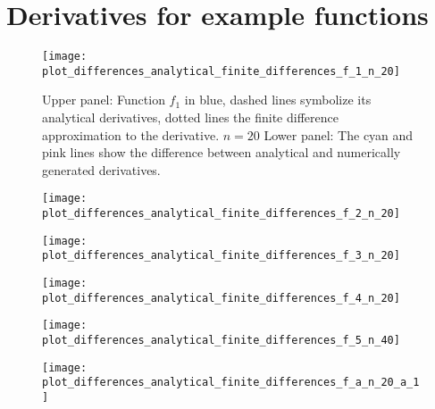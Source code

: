 \section{Derivatives for example functions}

\begin{figure}[h]
		\texttt{[image: plot\_differences\_analytical\_finite\_differences\_f\_1\_n\_20]}
		\caption{Upper panel: Function $f_1$ in blue, dashed lines symbolize its analytical derivatives, dotted lines the finite difference approximation to the derivative. $n= 20$  Lower panel: The cyan and pink lines show the difference between analytical and numerically generated derivatives.}
\end{figure}

\begin{figure}
		\texttt{[image: plot\_differences\_analytical\_finite\_differences\_f\_2\_n\_20]}
		\caption{}
\end{figure}

\begin{figure}
		\texttt{[image: plot\_differences\_analytical\_finite\_differences\_f\_3\_n\_20]}
	\caption{}
\end{figure}

\begin{figure}
		\texttt{[image: plot\_differences\_analytical\_finite\_differences\_f\_4\_n\_20]}
		\caption{}
\end{figure}


\begin{figure}
		\texttt{[image: plot\_differences\_analytical\_finite\_differences\_f\_5\_n\_40]}
		\caption{}
\end{figure}


\begin{figure}
		\texttt{[image: plot\_differences\_analytical\_finite\_differences\_f\_a\_n\_20\_a\_1]}
		\caption{}
\end{figure}